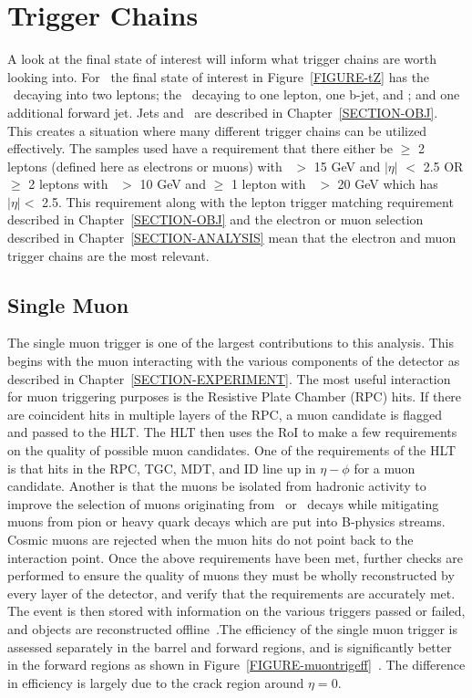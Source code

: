 \section{Trigger Chains}
\label{SECTION-TRIG-CHAIN}
 A look at the final state of interest will inform what trigger chains are worth looking into. For \tz~the final state of interest in Figure~\ref{FIGURE-tZ} has the \az~decaying into two leptons; the \at~decaying to one lepton, one b-jet, and \MET; and one additional forward jet. Jets and \MET~are described in Chapter~\ref{SECTION-OBJ}. This creates a situation where many different trigger chains can be utilized effectively. The samples used have a requirement that there either be $\geq$ 2 leptons (defined here as electrons or muons) with \PT~$>$ 15 GeV and $|\eta|$ $<$ 2.5 OR $\geq$ 2 leptons with \PT~$>$ 10 GeV and $\geq$ 1 lepton with \PT~$>$ 20 GeV which has $|\eta| <$ 2.5. This requirement along with the lepton trigger matching requirement described in Chapter~\ref{SECTION-OBJ} and the electron or muon selection described in Chapter~\ref{SECTION-ANALYSIS} mean that the electron and muon trigger chains are the most relevant. 


\subsection{Single Muon}
\label{SECTION-TRIGGERS-1mu}

The single muon trigger is one of the largest contributions to this analysis. This begins with the muon interacting with the various components of the detector as described in Chapter~\ref{SECTION-EXPERIMENT}. The most useful interaction for muon triggering purposes is the Resistive Plate Chamber (RPC) hits. If there are coincident hits in multiple layers of the RPC, a muon candidate is flagged and passed to the HLT. The HLT then uses the RoI to make a few requirements on the quality of possible muon candidates. One of the requirements of the HLT is that hits in the RPC, TGC, MDT, and ID line up in $\eta -\phi$ for a muon candidate. Another is that the muons be isolated from hadronic activity to improve the selection of muons originating from \aw~or \az~decays while mitigating muons from pion or heavy quark decays which are put into B-physics streams. Cosmic muons are rejected when the muon hits do not point back to the interaction point. Once the above requirements have been met, further checks are performed to ensure the quality of muons they must be wholly reconstructed by every layer of the detector, and verify that the requirements are accurately met. The event is then stored with information on the various triggers passed or failed, and objects are reconstructed offline~\cite{TrigProposal}.The efficiency of the single muon trigger is assessed separately in the barrel and forward regions, and is significantly better in the forward regions as shown in Figure~\ref{FIGURE-muontrigeff}~\cite{Bielski:2055529}. The difference in efficiency is largely due to the crack region around $\eta = 0$. 


